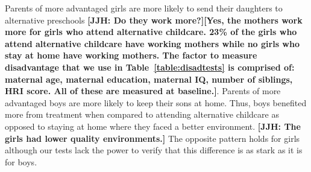 Parents of more advantaged girls are more likely to send their daughters to alternative preschools \textbf{[JJH: Do they work more?][Yes, the mothers work more for girls who attend alternative childcare. 23\% of the girls who attend alternative childcare have working mothers while no girls who stay at home have working mothers. The factor to measure disadvantage that we use in Table~\ref{table:disadtests} is comprised of: maternal age, maternal education, maternal IQ, number of siblings, HRI score. All of these are measured at baseline.]}. Parents of more advantaged boys are more likely to keep their sons at home. Thus, boys benefited more from treatment when compared to attending alternative childcare as opposed to staying at home where they faced a better environment. \textbf{[JJH: The girls had lower quality environments.]} The opposite pattern holds for girls although our tests lack the power to verify that this difference is as stark as it is for boys.











